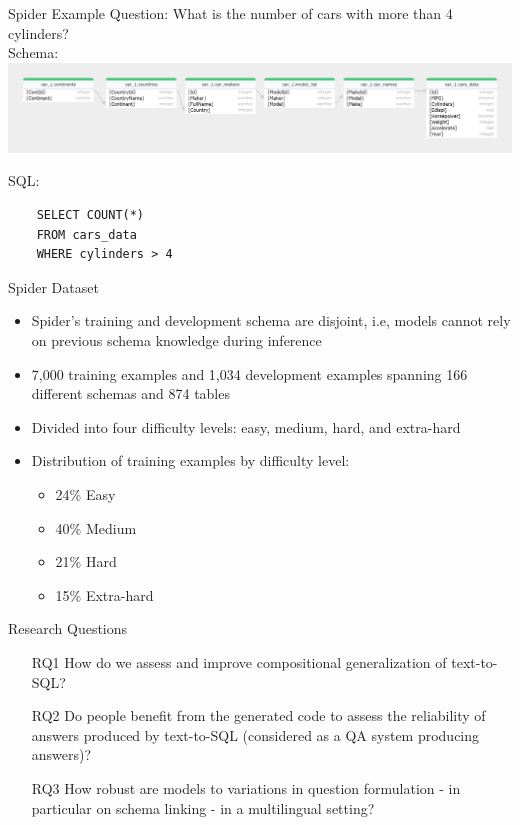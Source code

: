 \documentclass{beamer}
\begin{document}
\begin{frame}[fragile]{Spider Example}
    Question: What is the number of cars with more than 4 cylinders?\\

    Schema:
    \includegraphics[width=\textwidth]{car_1_erd.png}

    SQL:
    \begin{verbatim}
    SELECT COUNT(*)
    FROM cars_data
    WHERE cylinders > 4
    \end{verbatim}
\end{frame}

\begin{frame}{Spider Dataset}
    \begin{itemize}
        \item Spider's training and development schema are disjoint, i.e, models cannot rely on previous schema knowledge during inference
        \item 7,000 training examples and 1,034 development examples spanning 166 different schemas and 874 tables
        \item Divided into four difficulty levels: easy, medium, hard, and extra-hard
        \item Distribution of training examples by difficulty level:
        \begin{itemize}
            \item 24\% Easy
            \item 40\% Medium
            \item 21\% Hard
            \item 15\% Extra-hard
        \end{itemize}
    \end{itemize}
\end{frame}

\begin{frame}{Research Questions}
    \begin{itemize}
        \item[RQ1] How do we assess and improve compositional generalization of text-to-SQL?

        \item[RQ2] Do people benefit from the generated code to assess the reliability of answers produced by text-to-SQL (considered as a QA system producing answers)?

        \item[RQ3] How robust are models to variations in question formulation - in particular on schema linking - in a multilingual setting?
    \end{itemize}
\end{frame}
\end{document}
